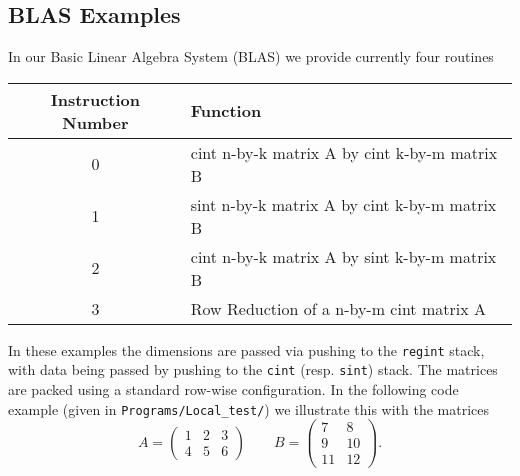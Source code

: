 \subsection{BLAS Examples}
In our Basic Linear Algebra System (BLAS) we provide currently four
routines
\begin{center}
\begin{tabular}{c|l}
Instruction Number & Function \\
\hline
0 & cint n-by-k matrix A by cint k-by-m matrix B \\
1 & sint n-by-k matrix A by cint k-by-m matrix B \\
2 & cint n-by-k matrix A by sint k-by-m matrix B \\
3 & Row Reduction of a n-by-m cint matrix A \\
\end{tabular}
\end{center}
In these examples the dimensions are passed via 
pushing to the \verb|regint| stack, with data
being passed by pushing to the \verb|cint| (resp.
\verb|sint|) stack.
The matrices are packed using a standard row-wise configuration.
In the following code example (given in \verb|Programs/Local_test/|)
we illustrate this with the matrices
\[
  A = \left( \begin{array}{ccc}
  1 & 2 & 3 \\  
  4 & 5 & 6 \end{array} \right) \quad \quad
  B = \left( \begin{array}{cc}
  7 & 8 \\
  9 & 10 \\
  11 & 12 
  \end{array} \right).
\]
